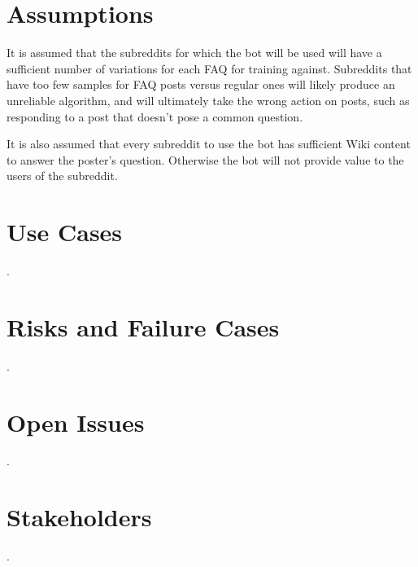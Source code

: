 \documentclass[dvips,11pt]{article}
\begin{document}
\section{Assumptions}

It is assumed that the subreddits for which the bot will be used will have a sufficient number of variations for each FAQ for training against. Subreddits that have too few samples for FAQ posts versus regular ones will likely produce an unreliable algorithm, and will ultimately take the wrong action on posts, such as responding to a post that doesn't pose a common question. 

It is also assumed that every subreddit to use the bot has sufficient Wiki content to answer the poster's question. Otherwise the bot will not provide value to the users of the subreddit.

\section{Use Cases}

.

\section{Risks and Failure Cases}

.

\section{Open Issues}

.

\section{Stakeholders}

.
\end{document}
